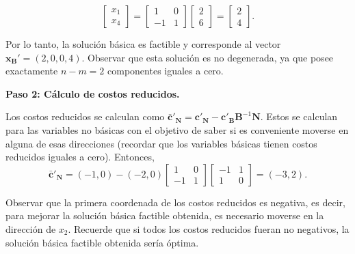 \begin{enumerate}
    \begin{equation}
        \begin{bmatrix}
            x_1 \\
            x_4
        \end{bmatrix}
        =
        \begin{bmatrix}
            1 & 0 \\
            -1 & 1
        \end{bmatrix}
        \begin{bmatrix}
            2 \\
            6
        \end{bmatrix}
        =
        \begin{bmatrix}
            2 \\
            4
        \end{bmatrix}.
    \end{equation}

    Por lo tanto, la solución básica  es factible y corresponde al vector $\mathbf{x}_{\mathbf{B}}' = (2,0,0,4).$ Observar que esta solución es no degenerada, ya que posee exactamente $n-m=2$ componentes iguales a cero.

    

    \noindent\textbf{Paso 2: Cálculo de costos reducidos.}


    Los costos reducidos se calculan como $\bar{\mathbf{c}}'_{\mathbf{N}}
        =
        \mathbf{c}'_{\mathbf{N}}
        -
        \mathbf{c}'_{\mathbf{B}}\mathbf{B}^{-1}\mathbf{N}$. Estos se calculan para las variables no básicas con el objetivo
de saber si es conveniente moverse en alguna de esas direcciones (recordar que los variables básicas tienen costos reducidos iguales a cero). Entonces,
    \begin{equation}
        \bar{\mathbf{c}}'_{\mathbf{N}}
        =
        (-1,0)
        -
        (-2,0)
        \begin{bmatrix}
            1 & 0 \\
            -1 & 1
        \end{bmatrix}
        \begin{bmatrix}
            -1 & 1 \\
            1 & 0
        \end{bmatrix}
        =
        (-3,2).
    \end{equation}

    Observar que la primera coordenada de los costos reducidos es negativa, es decir, para mejorar la solución básica factible obtenida, es necesario moverse en la dirección de $x_2$. Recuerde que si todos los costos reducidos fueran no negativos, la solución básica factible obtenida sería óptima.


\end{enumerate}
